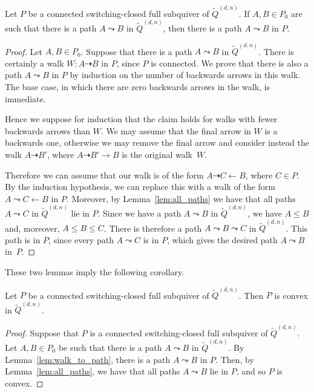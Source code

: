 \documentclass[ALCO,Unicode,published]{cedram}
\newcommand{\walk}{\dashrightarrow}
\newcommand{\tqdn}{\tilde{Q}^{(d, n)}}
\begin{document}
\begin{lemma}\label{lem:walk_to_path}
Let $P$ be a connected switching-closed full subquiver of $\tqdn$. If $A,B \in P_{0}$ are such that there is a path $A \leadsto B$ in $\tqdn$, then there is a path $A \leadsto B$ in $P$.
\end{lemma}
\begin{proof}
Let $A,B \in P_{0}$. Suppose that there is a path $A \leadsto B$ in $\tqdn$. There is certainly a walk $W \colon A \walk B$ in $P$, since $P$ is connected. We prove that there is also a path $A \leadsto B$ in $P$ by induction on the number of backwards arrows in this walk. The base case, in which there are zero backwards arrows in the walk, is immediate.

Hence we suppose for induction that the claim holds for walks with fewer backwards arrows than $W$. We may assume that the final arrow in $W$ is a backwards one, otherwise we may remove the final arrow and consider instead the walk $A \walk B'$, where $A \walk B' \rightarrow B$ is the original walk~$W$.

Therefore we can assume that our walk is of the form $A \walk C \leftarrow B$, where $C \in P$. By the induction hypothesis, we can replace this with a walk of the form $A \leadsto C \leftarrow B$ in $P$. Moreover, by Lemma~\ref{lem:all_paths} we have that all paths $A \leadsto C$ in $\tqdn$ lie in $P$. Since we have a path $A \leadsto B$ in $\tqdn$, we have $A \leqslant B$ and, moreover, $A \leqslant B \leqslant C$. There is therefore a path $A \leadsto B \leadsto C$ in $\tqdn$. This path is in $P$, since every path $A \leadsto C$ is in $P$, which gives the desired path $A \leadsto B$ in~$P$.
\end{proof}

These two lemmas imply the following corollary.

\begin{coro}\label{cor:switch+con->conv}
Let $P$ be a connected switching-closed full subquiver of $\tqdn$. Then $P$ is convex in $\tqdn$.
\end{coro}
\begin{proof}
Suppose that $P$ is a connected switching-closed full subquiver of $\tqdn$. Let $A, B \in P_{0}$ be such that there is a path $A \leadsto B$ in $\tqdn$. By Lemma~\ref{lem:walk_to_path}, there is a path $A \leadsto B$ in $P$. Then, by Lemma~\ref{lem:all_paths}, we have that all paths $A \leadsto B$ lie in $P$, and so $P$ is convex.
\end{proof}
\end{document}
